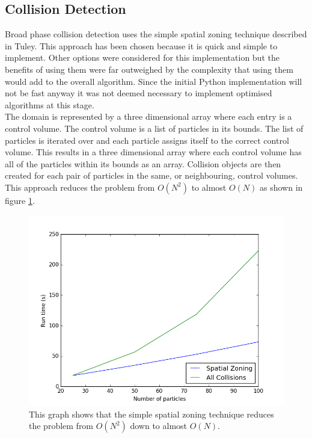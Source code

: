 \documentclass[10pt,a4paper,titlepage]{report}
\begin{document}
\subsection{Collision Detection}
\label{sec:Python Collision Detection}
Broad phase collision detection uses the simple spatial zoning technique described in Tuley\cite{tuley}. This approach has been chosen because it is quick and simple to implement. Other options were considered for this implementation but the benefits of using them were far outweighed by the complexity that using them would add to the overall algorithm. Since the initial Python implementation will not be fast anyway it was not deemed necessary to implement optimised algorithms at this stage.
\\The domain is represented by a three dimensional array where each entry is a control volume. The control volume is a list of particles in its bounds. The list of particles is iterated over and each particle assigns itself to the correct control volume. This results in a three dimensional array where each control volume has all of the particles within its bounds as an array. Collision objects are then created for each pair of particles in the same, or neighbouring, control volumes. This approach reduces the problem from $O(N^{2})$ to almost $O(N)$ as shown in figure \ref{fig:run_time_against_N_python}.
\begin{figure}[!ht]
\centering
\includegraphics[scale=0.75]{figures/RunTimeAgainstNumberOfParticlesPython.png}
\caption{This graph shows that the simple spatial zoning technique reduces the problem from $O(N^{2})$ down to almost $O(N)$.}
\label{fig:run_time_against_N_python}
\end{figure}
\end{document}
